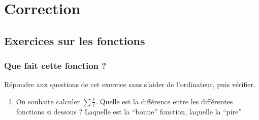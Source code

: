 \documentclass[letterpaper,10pt,english]{sphinxhowto}
\begin{document}
\sphinxAtStartPar
{}


\section{Correction}
\label{\detokenize{correction:correction}}\label{\detokenize{correction::doc}}

\subsection{Exercices sur les fonctions}
\label{\detokenize{cours1_fonctions_corr_exercices:exercices-sur-les-fonctions}}\label{\detokenize{cours1_fonctions_corr_exercices::doc}}

\subsubsection{Que fait cette fonction ?}
\label{\detokenize{cours1_fonctions_corr_exercices:que-fait-cette-fonction}}
\sphinxAtStartPar
Répondre aux questions de cet exercice sans s’aider de l’ordinateur, puis vérifier.
\begin{enumerate}
%
\item {} 
\sphinxAtStartPar
On souhaite calculer \(\sum \frac{1}{i}\). Quelle est la différence entre les différentes fonctions si dessous ? Laquelle est la “bonne” fonction, laquelle la “pire”

\end{enumerate}
\end{document}
